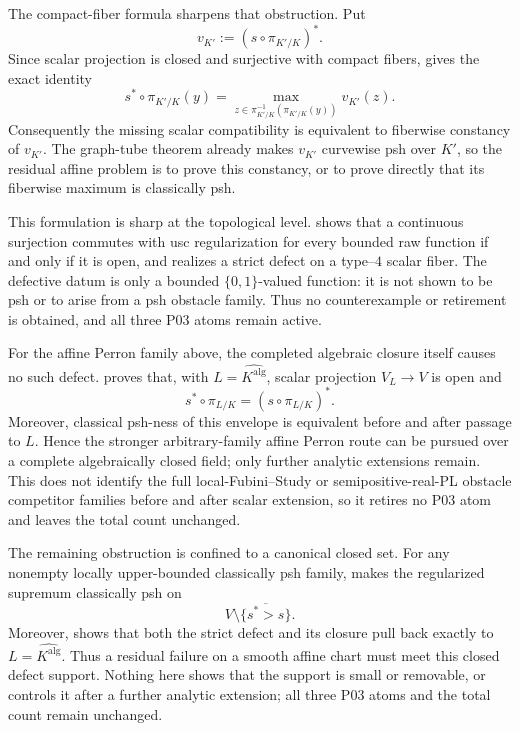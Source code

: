 The compact-fiber formula
 sharpens that obstruction.  Put
\[
       v_{K'}:=(s\circ\pi_{K'/K})^*.
\]
Since scalar projection is closed and surjective with compact fibers,
 gives the exact identity
\[
 s^*\circ\pi_{K'/K}(y)
   =\max_{z\in\pi_{K'/K}^{-1}(\pi_{K'/K}(y))}v_{K'}(z).
\]
Consequently the missing scalar compatibility is equivalent to
fiberwise constancy of \(v_{K'}\).  The graph-tube theorem already makes
\(v_{K'}\) curvewise psh over \(K'\), so the residual affine problem is to
prove this constancy, or to prove directly that its fiberwise maximum is
classically psh.

This formulation is sharp at the topological level.
 shows that a continuous
surjection commutes with usc regularization for every bounded raw function
if and only if it is open, and
 realizes a strict defect on
a type--\(4\) scalar fiber.  The defective datum is only a bounded
\(\{0,1\}\)-valued function: it is not shown to be psh or to arise from a
psh obstacle family.  Thus no counterexample or retirement is obtained,
and all three P03 atoms remain active.

For the affine Perron family above, the completed algebraic closure itself
causes no such defect.
 proves that, with
\(L=\widehat{K^{\mathrm{alg}}}\), scalar
projection \(V_L\to V\) is open and
\[
       s^*\circ\pi_{L/K}=(s\circ\pi_{L/K})^*.
\]
Moreover, classical psh-ness of this envelope is equivalent before and
after passage to \(L\).  Hence the stronger arbitrary-family affine Perron
route can be pursued over a complete algebraically closed field; only
further analytic extensions remain.  This does not identify the full
local-Fubini--Study or semipositive-real-PL obstacle competitor families
before and after scalar extension, so it retires no P03 atom and leaves the
total count unchanged.

The remaining obstruction is confined to a canonical closed set.
For any nonempty locally upper-bounded classically psh family,
 makes the regularized supremum
classically psh on
\[
   V\setminus\overline{\{s^*>s\}}.
\]
Moreover,
 shows that both
the strict defect and its closure pull back exactly to
\(L=\widehat{K^{\mathrm{alg}}}\).  Thus a residual failure on a smooth affine
chart must meet this closed defect support.  Nothing here shows that the
support is small or removable, or controls it after a further analytic
extension; all three P03 atoms and the total count remain unchanged.


